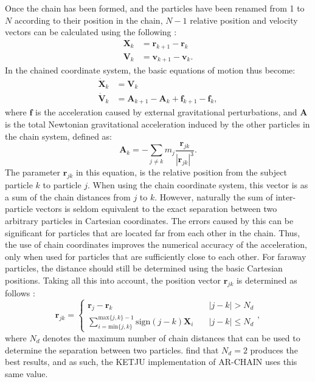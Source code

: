 \documentclass[english, twoside]{HYgradu}
\begin{document}
Once the chain has been formed, and the particles have been renamed from 1 to $N$ according to their position in the chain, $N - 1$ relative position and velocity vectors can be calculated using the following \citep{Mikkola2008ARCHAIN}:
\begin{equation}
\begin{split}
\mathbf{X}_k &= \mathbf{r}_{k+1} - \mathbf{r}_k \\
\mathbf{V}_k &= \mathbf{v}_{k+1} - \mathbf{v}_k.
\end{split}
\end{equation}
In the chained coordinate system, the basic equations of motion thus become:
\begin{equation}
\begin{split}
\dot{\mathbf{X}}_k &= \mathbf{V}_k \\
\dot{\mathbf{V}}_k &= \mathbf{A}_{k+1} - \mathbf{A}_{k} + \mathbf{f}_{k+1} - \mathbf{f}_{k},
\end{split}
\end{equation}
where $\mathbf{f}$ is the acceleration caused by external gravitational perturbations, and $\mathbf{A}$ is the total Newtonian gravitational acceleration induced by the other particles in the chain system, defined as:
\begin{equation}
\mathbf{A}_k = - \displaystyle\sum_{j \neq k} m_j \frac{\mathbf{r}_{jk}}{|\mathbf{r}_{jk}|^3}.
\end{equation}
The parameter $\mathbf{r}_{jk}$ in this equation, is the relative position from the subject particle $k$ to particle $j$. When using the chain coordinate system, this vector is as a sum of the chain distances from $j$ to $k$. However, naturally the sum of inter-particle vectors is seldom equivalent to the exact separation between two arbitrary particles in Cartesian coordinates. The errors caused by this can be significant for particles that are located far from each other in the chain. Thus, the use of chain coordinates improves the numerical accuracy of the acceleration, only when used for particles that are sufficiently close to each other. For faraway particles, the distance should still be determined using the basic Cartesian positions. Taking all this into account, the position vector $\mathbf{r}_{jk}$ is determined as follows \citep[e.g.][]{Rantala2017KETJU}:
\begin{equation}
\mathbf{r}_{jk} = 
	\begin{cases}
		\mathbf{r}_j - \mathbf{r}_k &\quad |j-k| > N_d \\
		\displaystyle\sum^{\mathrm{max} \{ j,k \}-1}_{i = \mathrm{min} \{ j,k \}} \mathrm{sign}(j-k) \mathbf{X}_i &\quad |j-k| \leq N_d
	\end{cases}, \label{eq:relative_dist}
\end{equation}
where $N_d$ denotes the maximum number of chain distances that can be used to determine the separation between two particles. \cite{Mikkola2008ARCHAIN} find that $N_d = 2$ produces the best results, and as such, the KETJU implementation of AR-CHAIN uses this same value.
\end{document}
